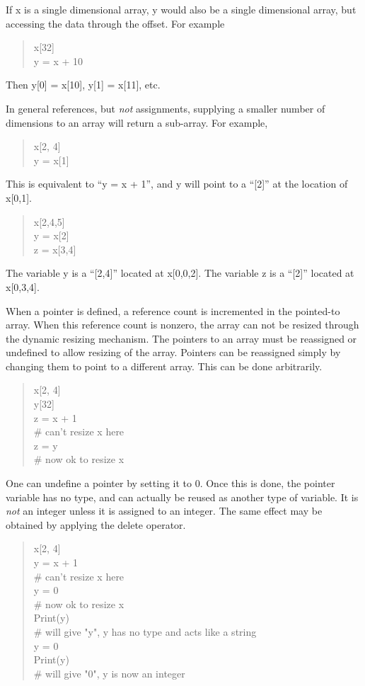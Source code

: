 If {\vt x} is a single dimensional array, {\vt y} would also be a
single dimensional array, but accessing the data through the offset. 
For example
\begin{quote}\vt
x[32]\\
y = x + 10
\end{quote}

Then {\vt y[0] = x[10]}, {\vt y[1] = x[11]}, etc.

In general references, but {\it not} assignments, supplying a smaller
number of dimensions to an array will return a sub-array.  For
example,
\begin{quote}\vt
x[2, 4]\\
y = x[1]
\end{quote}

This is equivalent to ``{\vt y = x + 1}'', and {\vt y} will point to a
``[2]'' at the location of {\vt x[0,1]}.

\begin{quote}\vt
x[2,4,5]\\
y = x[2]\\
z = x[3,4]
\end{quote}

The variable {\vt y} is a ``[2,4]'' located at {\vt x[0,0,2]}.  The
variable {\vt z} is a ``[2]'' located at {\vt x[0,3,4]}.

When a pointer is defined, a reference count is incremented in the
pointed-to array.  When this reference count is nonzero, the array can
not be resized through the dynamic resizing mechanism.  The pointers
to an array must be reassigned or undefined to allow resizing of the
array.  Pointers can be reassigned simply by changing them to point to
a different array.  This can be done arbitrarily.
\begin{quote}\vt
x[2, 4]\\
y[32]\\
z = x + 1\\
\# can't resize x here\\
z = y\\
\# now ok to resize x
\end{quote}

One can undefine a pointer by setting it to 0.  Once this is done, the
pointer variable has no type, and can actually be reused as another
type of variable.  It is {\it not} an integer unless it is assigned to
an integer.  The same effect may be obtained by applying the {\vt
delete} operator.
\begin{quote}\vt
x[2, 4]\\
y = x + 1\\
\# can't resize x here\\
y = 0\\
\# now ok to resize x\\
Print(y)\\
\# will give "y", y has no type and acts like a string\\
y = 0\\
Print(y)\\
\# will give "0", y is now an integer
\end{quote}

